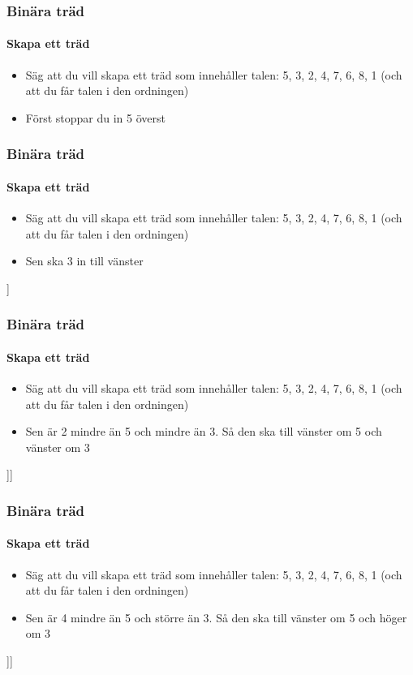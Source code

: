 \documentclass[aspectratio=169]{beamer}
\begin{document}
\begin{frame}
	\frametitle{Binära träd}
	\framesubtitle{Skapa ett träd}
	
	\begin{itemize}
		\item Säg att du vill skapa ett träd som innehåller talen: 5, 3, 2, 4, 7, 6, 8, 1 (och att du får talen i den ordningen)
		\item Först stoppar du in 5 överst
	\end{itemize}
	
	\centering
	\begin{forest}
		[5]
	\end{forest}

\end{frame}

\begin{frame}
	\frametitle{Binära träd}
	\framesubtitle{Skapa ett träd}
	
	\begin{itemize}
		\item Säg att du vill skapa ett träd som innehåller talen: 5, 3, 2, 4, 7, 6, 8, 1 (och att du får talen i den ordningen)
		\item Sen ska 3 in till vänster
	\end{itemize}
	
	\centering
	\begin{forest}
		[5 [3]]
	\end{forest}

\end{frame}

\begin{frame}
	\frametitle{Binära träd}
	\framesubtitle{Skapa ett träd}
	
	\begin{itemize}
		\item Säg att du vill skapa ett träd som innehåller talen: 5, 3, 2, 4, 7, 6, 8, 1 (och att du får talen i den ordningen)
		\item Sen är 2 mindre än 5 och mindre än 3. Så den ska till vänster om 5 och vänster om 3
	\end{itemize}
	
	\centering
	\begin{forest}
		[5 [3 [2]]]
	\end{forest}

\end{frame}

\begin{frame}
	\frametitle{Binära träd}
	\framesubtitle{Skapa ett träd}
	
	\begin{itemize}
		\item Säg att du vill skapa ett träd som innehåller talen: 5, 3, 2, 4, 7, 6, 8, 1 (och att du får talen i den ordningen)
		\item Sen är 4 mindre än 5 och större än 3. Så den ska till vänster om 5 och höger om 3
	\end{itemize}
	
	\centering
	\begin{forest}
		[5 [3 [2] [4]]]
	\end{forest}

\end{frame}
\end{document}
